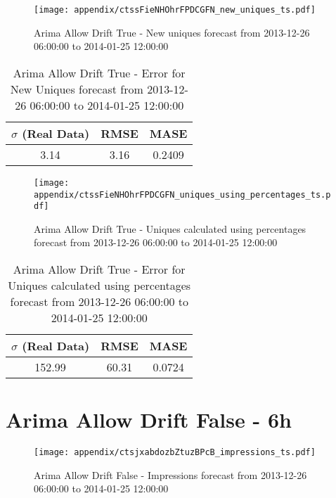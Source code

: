 \begin{figure}[H] \begin{center} \leavevmode
\texttt{[image: appendix/ctssFieNHOhrFPDCGFN\_new\_uniques\_ts.pdf]} \caption[]{
Arima Allow Drift True - New uniques forecast from 2013-12-26 06:00:00 to 2014-01-25 12:00:00} \label{fig:appendix/ctssFieNHOhrFPDCGFN_new_uniques_ts.pdf} \end{center}
\end{figure}

\begin{table}[H]
\centering
\footnotesize
\begin{tabular}{ccc}
$\sigma$ (Real Data) & RMSE & MASE   \\ \hline
3.14 & 3.16 & 0.2409 \\
\end{tabular}

\vspace{0.5cm}

\caption[]{
Arima Allow Drift True - Error for New Uniques forecast from 2013-12-26 06:00:00 to 2014-01-25 12:00:00}
\end{table}

\begin{figure}[H] \begin{center} \leavevmode
\texttt{[image: appendix/ctssFieNHOhrFPDCGFN\_uniques\_using\_percentages\_ts.pdf]} \caption[]{
Arima Allow Drift True - Uniques calculated using percentages forecast from 2013-12-26 06:00:00 to 2014-01-25 12:00:00} \label{fig:appendix/ctssFieNHOhrFPDCGFN_uniques_using_percentages_ts.pdf} \end{center}
\end{figure}

\begin{table}[H]
\centering
\footnotesize
\begin{tabular}{ccc}
$\sigma$ (Real Data) & RMSE & MASE   \\ \hline
152.99 & 60.31 & 0.0724 \\
\end{tabular}

\vspace{0.5cm}

\caption[]{
Arima Allow Drift True - Error for Uniques calculated using percentages forecast from 2013-12-26 06:00:00 to 2014-01-25 12:00:00}
\end{table}

\section{Arima Allow Drift False - 6h}
\begin{figure}[H] \begin{center} \leavevmode
\texttt{[image: appendix/ctsjxabdozbZtuzBPcB\_impressions\_ts.pdf]} \caption[]{
Arima Allow Drift False - Impressions forecast from 2013-12-26 06:00:00 to 2014-01-25 12:00:00} \label{fig:appendix/ctsjxabdozbZtuzBPcB_impressions_ts.pdf} \end{center}
\end{figure}

